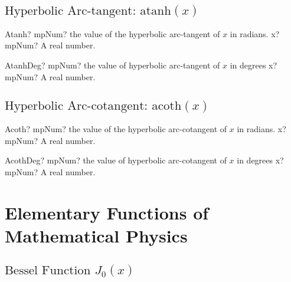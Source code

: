 \subsection{\texorpdfstring{$\text{Hyperbolic Arc-tangent: atanh}(x)$}{atanh}}

\begin{mpFunctionsExtract}
	\mpFunctionOne
	{Atanh? mpNum? the value of the hyperbolic arc-tangent  of $x$ in radians.}
	{x? mpNum? A real number.}
\end{mpFunctionsExtract}

\vspace{0.6cm}

\begin{mpFunctionsExtract}
	\mpFunctionOne
	{AtanhDeg? mpNum? the value of hyperbolic arc-tangent  of $x$ in degrees}
	{x? mpNum? A real number.}
\end{mpFunctionsExtract}





\subsection{\texorpdfstring{$\text{Hyperbolic Arc-cotangent: acoth}(x)$}{acoth}}


\begin{mpFunctionsExtract}
	\mpFunctionOne
	{Acoth? mpNum? the value of the hyperbolic arc-cotangent  of $x$ in radians.}
	{x? mpNum? A real number.}
\end{mpFunctionsExtract}

\vspace{0.6cm}

\begin{mpFunctionsExtract}
	\mpFunctionOne
	{AcothDeg? mpNum? the value of hyperbolic arc-cotangent  of $x$ in degrees}
	{x? mpNum? A real number.}
\end{mpFunctionsExtract}








\section{Elementary Functions of Mathematical Physics}

\subsection{\texorpdfstring{$\text{Bessel Function }J_0(x)$}{J0x}}

